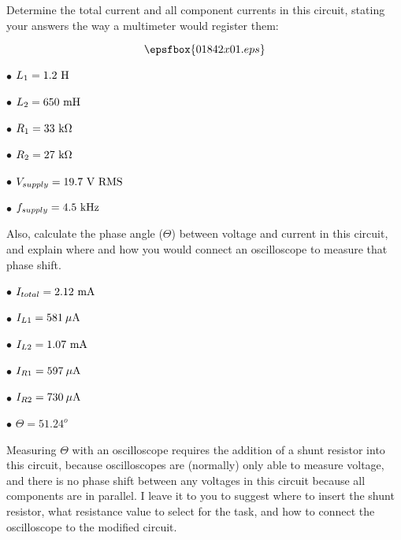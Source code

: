 

Determine the total current and all component currents in this circuit, stating your answers the way a multimeter would register them:

$$\epsfbox{01842x01.eps}$$

\goodbreak

\item{$\bullet$} $L_1 = 1.2 \hbox{ H}$
\item{$\bullet$} $L_2 = 650 \hbox{ mH}$
\item{$\bullet$} $R_1 = 33 \hbox{ k}\Omega$
\item{$\bullet$} $R_2 = 27 \hbox{ k}\Omega$
\item{$\bullet$} $V_{supply} = 19.7 \hbox{ V RMS}$
\item{$\bullet$} $f_{supply} = 4.5 \hbox{ kHz}$

\vskip 10pt

Also, calculate the phase angle ($\Theta$) between voltage and current in this circuit, and explain where and how you would connect an oscilloscope to measure that phase shift.







\item{$\bullet$} $I_{total} = 2.12 \hbox{ mA}$
\item{$\bullet$} $I_{L1} = 581 \> \mu \hbox{A}$
\item{$\bullet$} $I_{L2} = 1.07 \hbox{ mA}$
\item{$\bullet$} $I_{R1} = 597 \> \mu \hbox{A}$
\item{$\bullet$} $I_{R2} = 730 \> \mu \hbox{A}$
\item{$\bullet$} $\Theta = 51.24^o$
\medskip

Measuring $\Theta$ with an oscilloscope requires the addition of a shunt resistor into this circuit, because oscilloscopes are (normally) only able to measure voltage, and there is no phase shift between any voltages in this circuit because all components are in parallel.  I leave it to you to suggest where to insert the shunt resistor, what resistance value to select for the task, and how to connect the oscilloscope to the modified circuit.

